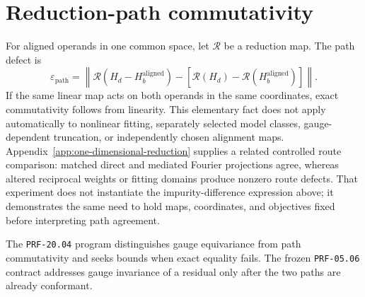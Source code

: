 
\section{Reduction-path commutativity}


For aligned operands in one common space, let $\mathcal R$ be a reduction map.
The path defect is
\begin{equation}
  \varepsilon_{\mathrm{path}}
  =
  \left\|
    \mathcal R(H_d-H_b^{\mathrm{aligned}})
    -
    [\mathcal R(H_d)-\mathcal R(H_b^{\mathrm{aligned}})]
  \right\|.
\end{equation}
If the same linear map acts on both operands in the same coordinates, exact
commutativity follows from linearity. This elementary fact does not apply
automatically to nonlinear fitting, separately selected model classes,
gauge-dependent truncation, or independently chosen alignment maps.
Appendix~\ref{app:one-dimensional-reduction} supplies a related controlled route
comparison: matched direct and mediated Fourier projections agree, whereas
altered reciprocal weights or fitting domains produce nonzero route defects.
That experiment does not instantiate the impurity-difference expression above;
it demonstrates the same need to hold maps, coordinates, and objectives fixed
before interpreting path agreement.

The \texttt{PRF-20.04} program distinguishes gauge equivariance from path
commutativity and seeks bounds when exact equality fails. The frozen
\texttt{PRF-05.06} contract addresses gauge invariance of a residual only after
the two paths are already conformant.
